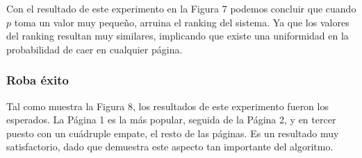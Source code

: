 Con el resultado de este experimento en la Figura 7 podemos concluir que cuando $p$ toma un valor muy pequeño,
arruina el ranking del sistema. Ya que los valores del ranking resultan muy similares, implicando que existe una uniformidad en la probabilidad de caer en cualquier página.

\subsubsection{Roba éxito}
Tal como muestra la Figura 8, los resultados de este experimento fueron los esperados. La Página 1 es la más popular, seguida de la Página 2, y en tercer puesto con un cuádruple empate, el resto de las páginas.
Es un resultado muy satisfactorio, dado que demuestra este aspecto tan importante del algoritmo.

